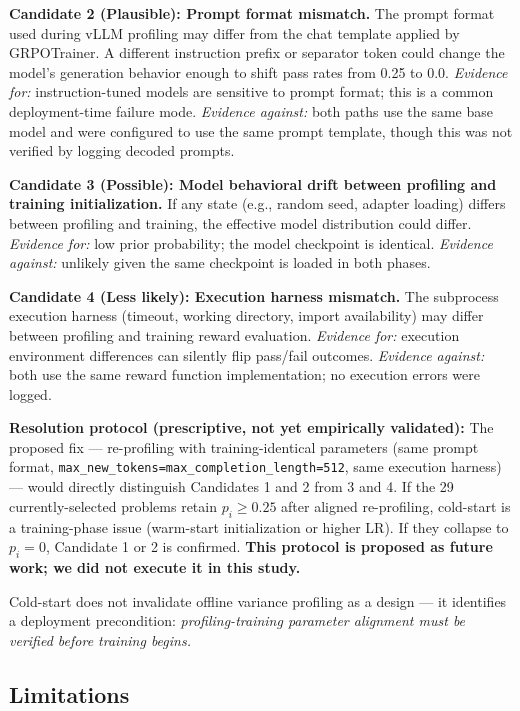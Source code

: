 \textbf{Candidate 2 (Plausible): Prompt format mismatch.} The prompt format used during vLLM profiling may differ from the chat template applied by GRPOTrainer. A different instruction prefix or separator token could change the model's generation behavior enough to shift pass rates from 0.25 to 0.0. \textit{Evidence for:} instruction-tuned models are sensitive to prompt format; this is a common deployment-time failure mode. \textit{Evidence against:} both paths use the same base model and were configured to use the same prompt template, though this was not verified by logging decoded prompts.

\textbf{Candidate 3 (Possible): Model behavioral drift between profiling and training initialization.} If any state (e.g., random seed, adapter loading) differs between profiling and training, the effective model distribution could differ. \textit{Evidence for:} low prior probability; the model checkpoint is identical. \textit{Evidence against:} unlikely given the same checkpoint is loaded in both phases.

\textbf{Candidate 4 (Less likely): Execution harness mismatch.} The subprocess execution harness (timeout, working directory, import availability) may differ between profiling and training reward evaluation. \textit{Evidence for:} execution environment differences can silently flip pass/fail outcomes. \textit{Evidence against:} both use the same reward function implementation; no execution errors were logged.

\textbf{Resolution protocol (prescriptive, not yet empirically validated):} The proposed fix --- re-profiling with training-identical parameters (same prompt format, \texttt{max\_new\_tokens=max\_completion\_length=512}, same execution harness) --- would directly distinguish Candidates 1 and 2 from 3 and 4. If the 29 currently-selected problems retain $p_i\geq0.25$ after aligned re-profiling, cold-start is a training-phase issue (warm-start initialization or higher LR). If they collapse to $p_i=0$, Candidate 1 or 2 is confirmed. \textbf{This protocol is proposed as future work; we did not execute it in this study.}

Cold-start does not invalidate offline variance profiling as a design --- it identifies a deployment precondition: \textit{profiling-training parameter alignment must be verified before training begins.}

\subsection{Limitations}

